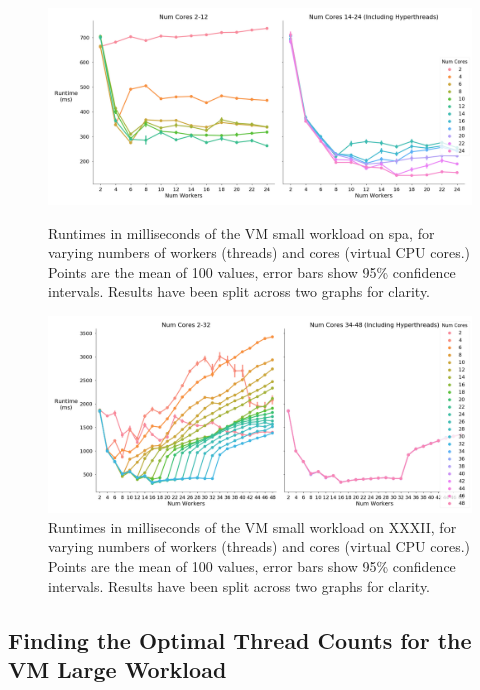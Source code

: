 \begin{figure}[H]
    \vspace*{-2.5cm}
    \centerline{\includegraphics[width=1.5\textwidth]{graphics/optimal_threads/spa/optimal_threads_vm_small.png}}
    \caption{Runtimes in milliseconds of the VM small workload on spa, for varying numbers of workers (threads) and cores (virtual CPU cores.) Points are the mean of 100 values, error bars show 95\% confidence intervals. Results have been split across two graphs for clarity.}
    \label{fig:opt_spa_vm_small}
    
    \centerline{\includegraphics[width=1.5\textwidth]{graphics/optimal_threads/XXXII/optimal_threads_vm_small.png}}
    \caption{Runtimes in milliseconds of the VM small workload on XXXII, for varying numbers of workers (threads) and cores (virtual CPU cores.) Points are the mean of 100 values, error bars show 95\% confidence intervals. Results have been split across two graphs for clarity.}
    \label{fig:opt_xxxii_vm_small}
\end{figure}



\subsection{Finding the Optimal Thread Counts for the VM Large Workload}
\label{section:results:finding_the_optimal_thread_couonts_for_the_vm_large_workload}

